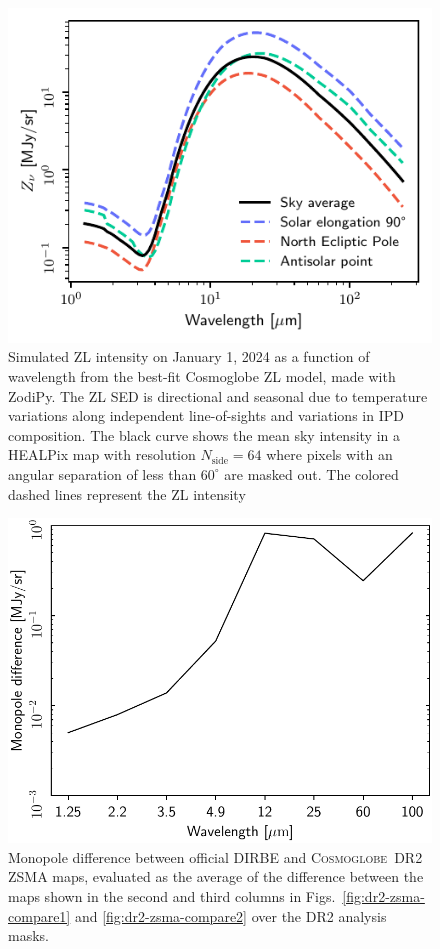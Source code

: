 \documentclass[twocolumn]{aa}
\def\cosmoglobe{\textsc{Cosmoglobe}}
\begin{document}
\begin{figure}
    \centering
    \includegraphics[width=\columnwidth]{figs/zodi_intensity.pdf}
    \caption{Simulated ZL intensity on January 1, 2024 as a function of wavelength from the best-fit 
    Cosmoglobe ZL model, made with ZodiPy. The ZL SED is directional 
    and seasonal due to temperature variations along independent line-of-sights and variations in IPD composition. 
    The black curve shows the mean sky intensity in a HEALPix map with resolution
    $N_\mathrm{side}= 64$ where pixels with an angular separation of less than
    $60^\circ$ are masked out. The colored dashed lines represent the ZL 
    intensity
    }
    \label{fig:zodi-intensity}
\end{figure}


\begin{figure}
    \centering
    \includegraphics[width=\linewidth]{figs/zodi_mean_diff_DIRBE_DR2.pdf}
    \caption{Monopole difference between official DIRBE and
      \cosmoglobe\ DR2 ZSMA maps, evaluated as the average of the
      difference between the maps shown in the second and third
      columns in Figs.~\ref{fig:dr2-zsma-compare1} and
      \ref{fig:dr2-zsma-compare2} over the DR2 analysis masks.}
    \label{fig:zsma_mean}
\end{figure}
\end{document}

